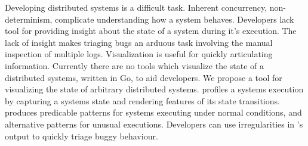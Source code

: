 Developing distributed systems is a difficult task. Inherent concurrency,
non-determinism, complicate understanding how a system behaves. Developers
lack tool for providing insight about the state of a system during it's
execution.  The lack of insight makes triaging bugs an arduous task involving
the manual inspection of multiple logs. Visualization is useful for quickly
articulating information. Currently there are no tools which visualize the
state of a distributed systems, written in Go, to aid developers. We propose \dviz a tool
for visualizing the state of arbitrary distributed systems. \dviz profiles a
systems execution by capturing a systems state and rendering features of its
state transitions. \dviz produces predicable patterns for systems executing
under normal conditions, and alternative patterns for unusual executions.
Developers can use irregularities in \dviz's output to quickly triage buggy
behaviour.
